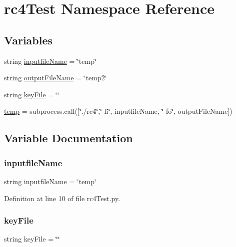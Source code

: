 \hypertarget{namespacerc4_test}{}\section{rc4\+Test Namespace Reference}
\label{namespacerc4_test}
\subsection*{Variables}
\begin{DoxyCompactItemize}
\item 
string \hyperlink{namespacerc4_test_ab08eaf3f1d5d16116f416e0968df63f6}{inputfile\+Name} = \char`\"{}temp\char`\"{}
\item 
string \hyperlink{namespacerc4_test_aaae3bfdd654e72f5b6cca95ce6467170}{output\+File\+Name} = \char`\"{}temp2\char`\"{}
\item 
string \hyperlink{namespacerc4_test_a399a06f7a52ec2592bd7dc1fe0998548}{key\+File} = \char`\"{}\char`\"{}
\item 
\hyperlink{namespacerc4_test_a905c521e05ec8042631a912b71d0454e}{temp} = subprocess.\+call(\mbox{[}\char`\"{}./rc4\char`\"{},\char`\"{}-\/fi\char`\"{}, inputfile\+Name, \char`\"{}-\/fo\char`\"{}, output\+File\+Name\mbox{]})
\end{DoxyCompactItemize}


\subsection{Variable Documentation}
\mbox{\label{namespacerc4_test_ab08eaf3f1d5d16116f416e0968df63f6}} 
\subsubsection{\texorpdfstring{inputfile\+Name}{inputfileName}}
{\footnotesize\ttfamily string inputfile\+Name = \char`\"{}temp\char`\"{}}



Definition at line 10 of file rc4\+Test.\+py.

\mbox{\label{namespacerc4_test_a399a06f7a52ec2592bd7dc1fe0998548}} 
\subsubsection{\texorpdfstring{key\+File}{keyFile}}
{\footnotesize\ttfamily string key\+File = \char`\"{}\char`\"{}}



